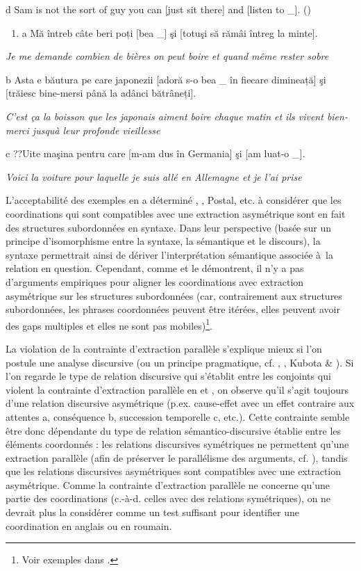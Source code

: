   d  Sam is not the sort of guy you can [just sit there] and [listen to \_].  (\citet{Lakoff1986})


\begin{enumerate}
\item \label{bkm:Ref272882957}a  Mă întreb câte beri poți [bea \_] şi [totuşi să rămâi întreg la minte].


\end{enumerate}
{\itshape
Je me demande combien de bières on peut boire et quand même rester sobre}

  b  Asta e băutura pe care japonezii [adoră s-o bea \_ în fiecare dimineață] şi [trăiesc bine-mersi până la adânci bătrâneți].

{\itshape
C'est ça la boisson que les japonais aiment boire chaque matin et ils vivent bien-merci jusqu{\textasciigrave}à leur profonde vieillesse } 

  c  ??Uite maşina pentru care [m-am dus în Germania] şi [am luat-o \_].

{\itshape
Voici la voiture pour laquelle je suis allé en Allemagne et je l'ai prise}

L'acceptabilité des exemples en  a déterminé \citet{Ross1967}, \citet{Goldsmith1985}, Postal, etc. à considérer que les coordinations qui sont compatibles avec une extraction asymétrique sont en fait des structures subordonnées en syntaxe. Dans leur perspective (basée sur un principe d'isomorphisme entre la syntaxe, la sémantique et le discours), la syntaxe permettrait ainsi de dériver l'interprétation sémantique associée à~la relation en question. Cependant, comme \citet{Lakoff1986} et \citet{Kehler2002} le démontrent, il n'y a pas d'arguments empiriques pour aligner les coordinations avec extraction asymétrique sur les structures subordonnées (car, contrairement aux structures subordonnées, les phrases coordonnées peuvent être itérées, elles peuvent avoir des gaps multiples et elles ne sont pas mobiles)\footnote{Voir exemples dans \citet{Chaves2007}.}. 

La violation de la contrainte d'extraction parallèle s'explique mieux si l'on postule une analyse discursive (ou un principe pragmatique, cf. \citet{Lakoff1986}, \citet{Kehler2002}, Kubota \& \citet{Lee2008}). Si l'on regarde le type de relation discursive qui s'établit entre les conjoints qui violent la contrainte d'extraction parallèle en  et , on observe qu'il s'agit toujours d'une relation discursive asymétrique (p.ex. cause-effet avec un effet contraire aux attentes a, conséquence b, succession temporelle c, etc.). Cette contrainte semble être donc dépendante du type de relation sémantico-discursive établie entre les éléments coordonnés : les relations discursives symétriques ne permettent qu'une extraction parallèle (afin de préserver le parallélisme des arguments, cf. \citet{Kehler2002}), tandis que les relations discursives asymétriques sont compatibles avec une extraction asymétrique. Comme la contrainte d'extraction parallèle ne concerne qu'une partie des coordinations (c.-à-d. celles avec des relations symétriques), on ne devrait plus la considérer comme un test suffisant pour identifier une coordination en anglais ou en roumain.  

